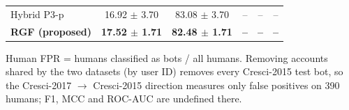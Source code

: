 \begin{table}[!t]
\begin{tabular}{lccccc}
Hybrid P3-p & 16.92 $\pm$ 3.70 & 83.08 $\pm$ 3.70 & -- & -- & -- \\
\textbf{RGF (proposed)} & \textbf{17.52 $\pm$ 1.71} & \textbf{82.48 $\pm$ 1.71} & \textbf{--} & \textbf{--} & \textbf{--} \\
\hline
\end{tabular}
\par\smallskip\parbox{\linewidth}{\scriptsize Human FPR = humans classified as bots / all humans. Removing accounts shared by the two datasets (by user ID) removes every Cresci-2015 test bot, so the Cresci-2017 $\rightarrow$ Cresci-2015 direction measures only false positives on 390 humans; F1, MCC and ROC-AUC are undefined there.}
\end{table}